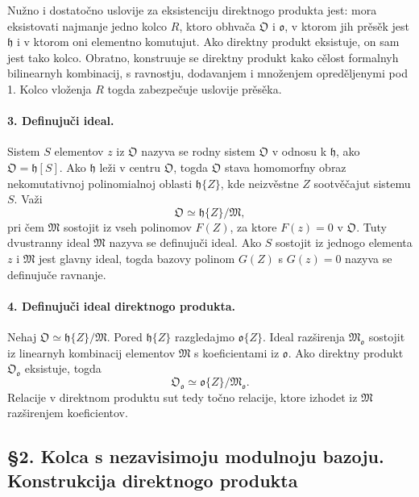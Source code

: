 \documentclass[11pt]{article}
\begin{document}
Nužno i dostatočno uslovije za eksistenciju direktnogo produkta jest: mora eksistovati najmanje jedno kolco \(R\), ktoro obhvača \(\mathfrak O\) i \(\mathfrak o\), v ktorom jih prěsěk jest \(\mathfrak h\) i v ktorom oni elementno komutujut. Ako direktny produkt eksistuje, on sam jest tako kolco. Obratno, konstruuje se direktny produkt kako cělost formalnyh bilinearnyh kombinacij, s ravnostju, dodavanjem i množenjem opreděljenymi pod 1. Kolco vloženja \(R\) togda zabezpečuje uslovije prěsěka.

\paragraph{3. Definujuči ideal.}
Sistem \(S\) elementov \(z\) iz \(\mathfrak O\) nazyva se rodny sistem \(\mathfrak O\) v odnosu k \(\mathfrak h\), ako \(\mathfrak O=\mathfrak h[S]\). Ako \(\mathfrak h\) leži v centru \(\mathfrak O\), togda \(\mathfrak O\) stava homomorfny obraz nekomutativnoj polinomialnoj oblasti \(\mathfrak h\{Z\}\), kde neizvěstne \(Z\) sootvěčajut sistemu \(S\). Važi
\[
        \mathfrak O\simeq \mathfrak h\{Z\}/\mathfrak M,
\]
pri čem \(\mathfrak M\) sostojit iz vseh polinomov \(F(Z)\), za ktore \(F(z)=0\) v \(\mathfrak O\). Tuty dvustranny ideal \(\mathfrak M\) nazyva se definujuči ideal. Ako \(S\) sostojit iz jednogo elementa \(z\) i \(\mathfrak M\) jest glavny ideal, togda bazovy polinom \(G(Z)\) s \(G(z)=0\) nazyva se definujuče ravnanje.

\paragraph{4. Definujuči ideal direktnogo produkta.}
Nehaj \(\mathfrak O\simeq\mathfrak h\{Z\}/\mathfrak M\). Pored \(\mathfrak h\{Z\}\) razgledajmo \(\mathfrak o\{Z\}\). Ideal razširenja \(\mathfrak M_{\mathfrak o}\) sostojit iz linearnyh kombinacij elementov \(\mathfrak M\) s koeficientami iz \(\mathfrak o\). Ako direktny produkt \(\mathfrak O_{\mathfrak o}\) eksistuje, togda
\[
        \mathfrak O_{\mathfrak o}\simeq \mathfrak o\{Z\}/\mathfrak M_{\mathfrak o}.
\]
Relacije v direktnom produktu sut tedy točno relacije, ktore izhodet iz \(\mathfrak M\) razširenjem koeficientov.

\subsection*{§2. Kolca s nezavisimoju modulnoju bazoju. Konstrukcija direktnogo produkta}
\end{document}
